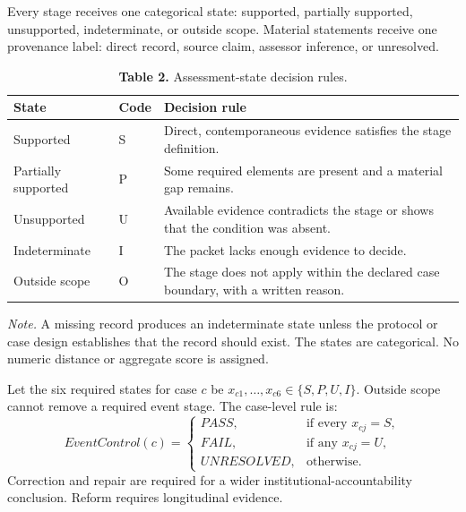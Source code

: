 \documentclass[11pt]{article}
\begin{document}
Every stage receives one categorical state: supported, partially supported, unsupported, indeterminate, or outside scope. Material statements receive one provenance label: direct record, source claim, assessor inference, or unresolved.
\begin{table}[!htbp]
\centering
\caption*{\textcolor{TAENavy}{\textbf{Table 2.}} Assessment-state decision rules.}
\footnotesize
{}
\begin{tabularx}{\linewidth}{@{}>{\raggedright\arraybackslash}p{}>{\centering\arraybackslash}p{}>{\raggedright\arraybackslash}X@{}}
\toprule
\rowcolor{TAEPaleNavy}
\textcolor{TAENavy}{\textbf{State}} & \textcolor{TAENavy}{\textbf{Code}} & \textcolor{TAENavy}{\textbf{Decision rule}} \\
\midrule
Supported & S & Direct, contemporaneous evidence satisfies the stage definition. \\
Partially supported & P & Some required elements are present and a material gap remains. \\
Unsupported & U & Available evidence contradicts the stage or shows that the condition was absent. \\
Indeterminate & I & The packet lacks enough evidence to decide. \\
Outside scope & O & The stage does not apply within the declared case boundary, with a written reason. \\
\bottomrule
\end{tabularx}
\par\vspace{2pt}\footnotesize\textit{Note.} A missing record produces an indeterminate state unless the protocol or case design establishes that the record should exist. The states are categorical. No numeric distance or aggregate score is assigned.
\end{table}

Let the six required states for case $c$ be $x_{c1},\ldots,x_{c6}\in\{S,P,U,I\}$. Outside scope cannot remove a required event stage. The case-level rule is:
\[
EventControl(c)=
\begin{cases}
PASS, & \text{if every }x_{cj}=S,\\
FAIL, & \text{if any }x_{cj}=U,\\
UNRESOLVED, & \text{otherwise.}
\end{cases}
\]
Correction and repair are required for a wider institutional-accountability conclusion. Reform requires longitudinal evidence.
\end{document}

